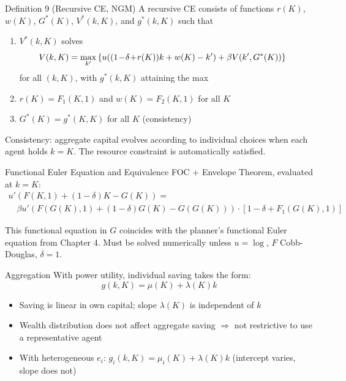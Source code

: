 \documentclass[blue]{beamer}
\begin{document}
\begin{frame}{Definition 9 (Recursive CE, NGM)}
	A recursive CE consists of functions $r(K)$, $w(K)$, $G^*(K)$, $V^*(k,K)$, and $g^*(k,K)$ such that
	
	\begin{enumerate}
		\item $V^*(k,K)$ solves
		\[
\hspace{-10pt}		V(k,K) = \max_{k'} \left\{ u((1\!-\!\delta\!+\!r(K))k + w(K) - k') + \beta V(k', G^*(K)) \right\}
		\]
		for all $(k,K)$, with $g^*(k,K)$ attaining the max
		
		\item $r(K) = F_1(K,1)$ and $w(K) = F_2(K,1)$ for all $K$
		
		\item $G^*(K) = g^*(K,K)$ for all $K$ \quad (consistency)
	\end{enumerate}
	
	\medskip
	Consistency: aggregate capital evolves according to individual choices when each agent holds $k = K$. The resource constraint is automatically satisfied.
\end{frame}

\begin{frame}{Functional Euler Equation and Equivalence}
	FOC $+$ Envelope Theorem, evaluated at $k = K$:
	\[
	\begin{array}{l}
	u'(F(K,1) + (1\!-\!\delta)K - G(K)) =\\
	\quad\beta u'(F(G(K),1) + (1\!-\!\delta)G(K) - G(G(K))) \cdot [1\!-\!\delta+F_1(G(K),1)]
	\end{array}
	\]
	
	This functional equation in $G$ coincides with the planner's functional Euler equation from Chapter 4. Must be solved numerically unless $u = \log$, $F$ Cobb-Douglas, $\delta = 1$.
\end{frame}

\begin{frame}{Aggregation}
	With power utility, individual saving takes the form:
	\[
	g(k, K) = \mu(K) + \lambda(K) k
	\]
	
	\begin{itemize}
		\item Saving is linear in own capital; slope $\lambda(K)$ is independent of $k$
		\item Wealth distribution does not affect aggregate saving $\Rightarrow$ not restrictive to use a representative agent
		\item With heterogeneous $e_i$: $g_i(k,K) = \mu_i(K) + \lambda(K) k$ (intercept varies, slope does not)
	\end{itemize}
\end{frame}
\end{document}
